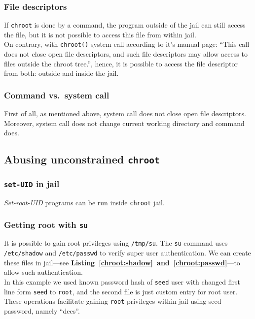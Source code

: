 \documentclass[12pt, a4paper, pdflatex]{article}
\begin{document}
\subsubsection{File descriptors}
If \texttt{chroot} is done by a command, the program outside of the jail can still access the file, but it is not possible to access this file from within jail.\\
On contrary, with \texttt{chroot()} system call according to it's manual page: ``This call does not close open file descriptors, and such file descriptors may allow access to files outside the chroot tree.'', hence, it is possible to access the file descriptor from both: outside and inside the jail.

\subsubsection{Command vs.\ system call}
First of all, as mentioned above, system call does not close open file descriptors. Moreover, system call does not change current working directory and command does.

\subsection{Abusing unconstrained \texttt{chroot}}
\subsubsection{\texttt{set-UID} in jail}
\emph{Set-root-UID} programs can be run inside \texttt{chroot} jail.

\subsubsection{Getting root with \texttt{su}}
It is possible to gain root privileges using \texttt{/tmp/su}. The \texttt{su} command uses \texttt{/etc/shadow} and \texttt{/etc/passwd} to verify super user authentication. We can create these files in jail---see \textbf{Listing~\ref{chroot:shadow}~and~\ref{chroot:passwd}}---to allow such authentication.\\
In this example we used known password hash of \texttt{seed} user with changed first line form \texttt{seed} to \texttt{root}, and the second file is just custom entry for root user.\\
These operations facilitate gaining \texttt{root} privileges within jail using seed password, namely ``dees''.
\end{document}
